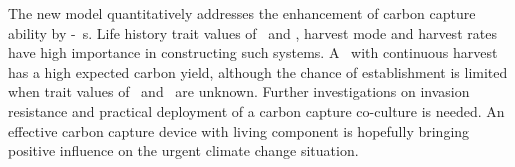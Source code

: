 \documentclass[../thesis.tex]{subfiles} %
\begin{document}
The new model quantitatively addresses the enhancement of carbon capture ability by \phy-\bac\ \pbs s.  Life history trait values of \phy\ and \bac, harvest mode and harvest rates have high importance in constructing such systems.  A \pbs\ with continuous harvest has a high expected carbon yield, although the chance of establishment is limited when trait values of \phy\ and \bac\ are unknown.  Further investigations on invasion resistance and practical deployment of a carbon capture co-culture is needed.  An effective carbon capture device with living component is hopefully bringing positive influence on the urgent climate change situation.
\end{document}
